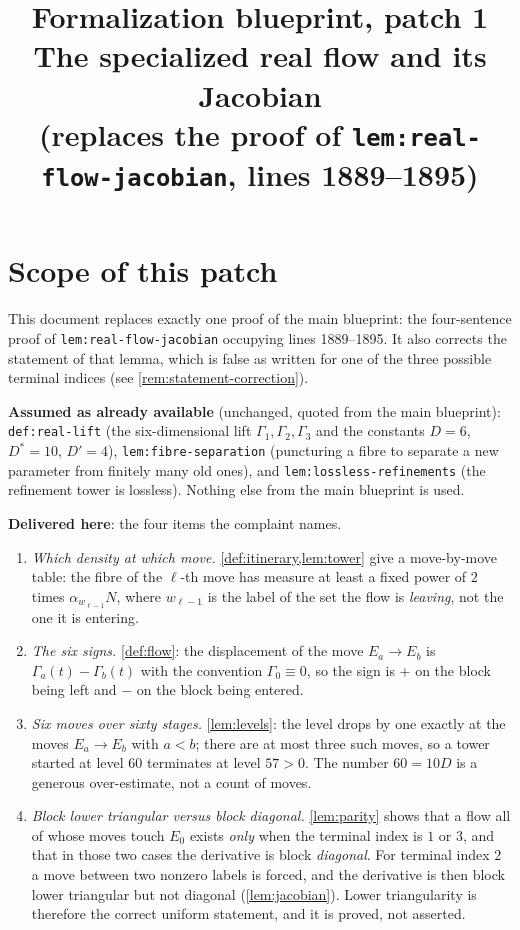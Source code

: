 \documentclass[11pt]{article}
\title{Formalization blueprint, patch 1\\
  \large The specialized real flow and its Jacobian\\
  \normalsize (replaces the proof of \texttt{lem:real-flow-jacobian}, lines 1889--1895)}
\date{}
\begin{document}
\maketitle

\section*{Scope of this patch}

This document replaces exactly one proof of the main blueprint: the four-sentence
proof of \texttt{lem:real-flow-jacobian} occupying lines 1889--1895.  It also
corrects the statement of that lemma, which is false as written for one of the
three possible terminal indices (see \cref{rem:statement-correction}).

\textbf{Assumed as already available} (unchanged, quoted from the main blueprint):
\texttt{def:real-lift} (the six-dimensional lift $\Gamma_1,\Gamma_2,\Gamma_3$ and
the constants $D=6$, $D^\ast=10$, $D'=4$), \texttt{lem:fibre-separation}
(puncturing a fibre to separate a new parameter from finitely many old ones), and
\texttt{lem:lossless-refinements} (the refinement tower is lossless).
Nothing else from the main blueprint is used.

\textbf{Delivered here}: the four items the complaint names.
\begin{enumerate}[label=(\alph*)]
  \item \emph{Which density at which move.}  \cref{def:itinerary,lem:tower} give a
    move-by-move table: the fibre of the $\ell$-th move has measure at least a
    fixed power of $2$ times $\alpha_{w_{\ell-1}}N$, where $w_{\ell-1}$ is the
    label of the set the flow is \emph{leaving}, not the one it is entering.
  \item \emph{The six signs.}  \cref{def:flow}: the displacement of the move
    $E_a\to E_b$ is $\Gamma_a(t)-\Gamma_b(t)$ with the convention
    $\Gamma_0\equiv 0$, so the sign is $+$ on the block being left and $-$ on the
    block being entered.
  \item \emph{Six moves over sixty stages.}  \cref{lem:levels}: the level drops by
    one exactly at the moves $E_a\to E_b$ with $a<b$; there are at most three such
    moves, so a tower started at level $60$ terminates at level $57>0$.  The
    number $60=10D$ is a generous over-estimate, not a count of moves.
  \item \emph{Block lower triangular versus block diagonal.}  \cref{lem:parity}
    shows that a flow all of whose moves touch $E_0$ exists \emph{only} when the
    terminal index is $1$ or $3$, and that in those two cases the derivative is
    block \emph{diagonal}.  For terminal index $2$ a move between two nonzero
    labels is forced, and the derivative is then block lower triangular but not
    diagonal (\cref{lem:jacobian}).  Lower triangularity is therefore the correct
    uniform statement, and it is proved, not asserted.
\end{enumerate}
\end{document}
